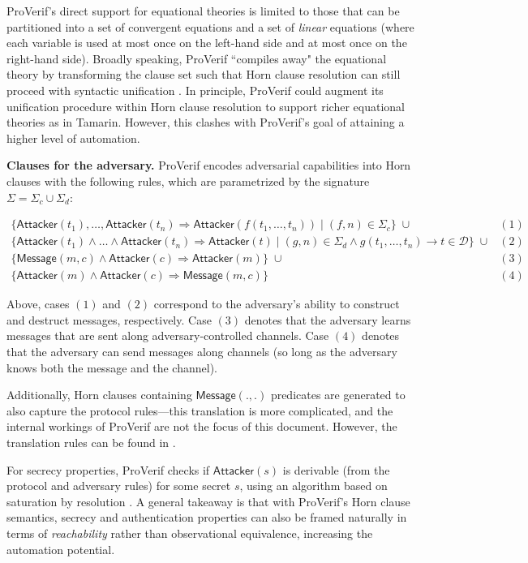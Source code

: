 \documentclass{article}
\theoremstyle{definition}
\begin{document}
ProVerif's direct support for equational theories is limited to those that can be partitioned into a set of convergent equations and a set of \emph{linear} equations (where each variable is used at most once on the left-hand side and at most once on the right-hand side). Broadly speaking, ProVerif ``compiles away" the equational theory by transforming the clause set such that Horn clause resolution can still proceed with syntactic unification \cite{proverif_equations}. In principle, ProVerif could augment its unification procedure within Horn clause resolution to support richer equational theories as in Tamarin. However, this clashes with ProVerif's goal of attaining a higher level of automation.

\textbf{Clauses for the adversary.} ProVerif encodes adversarial capabilities into Horn clauses with the following rules, which are parametrized by the signature $\Sigma = \Sigma_c \cup \Sigma_d$:

$
\begin{array}{cc}
\{ \textsf{Attacker}(t_1), \dots, \textsf{Attacker}(t_n) \Rightarrow \textsf{Attacker}(f(t_1, \dots, t_n)) \mid (f, n) \in \Sigma_c \} \;\cup & (1) \\
\{ \textsf{Attacker}(t_1) \land \dots \land \textsf{Attacker}(t_n) \Rightarrow \textsf{Attacker}(t) \mid (g, n) \in \Sigma_d \land g(t_1, \dots, t_n) \longrightarrow t \in \mathcal{D} \} \;\cup & (2)\\
\{ \textsf{Message}(m, c) \land \textsf{Attacker}(c) \Rightarrow \textsf{Attacker}(m) \} \;\cup & (3)\\ 
\{ \textsf{Attacker}(m) \land \textsf{Attacker}(c) \Rightarrow \textsf{Message}(m, c) \} & (4)
\end{array}
$

Above, cases $(1)$ and $(2)$ correspond to the adversary's ability to construct and destruct messages, respectively. Case $(3)$ denotes that the adversary learns messages that are sent along adversary-controlled channels. Case $(4)$ denotes that the adversary can send messages along channels (so long as the adversary knows both the message and the channel).

Additionally, Horn clauses containing $\textsf{Message}(.,.)$ predicates are generated 
to also capture the protocol rules---this translation is more complicated, 
and the internal workings of ProVerif are not the focus of this document. 
However, the translation rules can be found in \cite{proverif_2016}. 

For secrecy properties, ProVerif checks if $\mathsf{Attacker}(s)$ is derivable (from the protocol and adversary rules) for some secret $s$, using an algorithm based on saturation by resolution \cite{proverif}. A general takeaway is that with ProVerif's Horn clause semantics, secrecy and authentication  properties can also be framed naturally in terms of \textit{reachability} rather than observational equivalence, increasing the automation potential.
\end{document}
